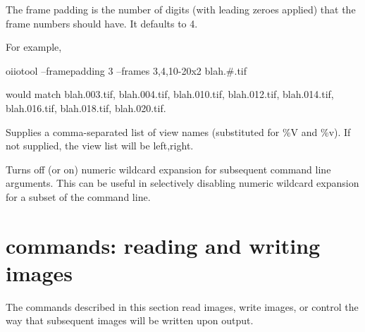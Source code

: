 The frame padding is the number of digits (with leading zeroes applied)
that the frame numbers should have.  It defaults to 4.

For example,
\begin{code}
    oiiotool --framepadding 3 --frames 3,4,10-20x2 blah.#.tif
\end{code}
\noindent would match {\cf blah.003.tif}, {\cf blah.004.tif},
{\cf blah.010.tif}, {\cf blah.012.tif}, 
{\cf blah.014.tif}, {\cf blah.016.tif}, {\cf blah.018.tif}, 
{\cf blah.020.tif}.
\apiend

Supplies a comma-separated list of view names (substituted for {\cf \%V}
and {\cf \%v}). If not supplied, the view list will be {\cf left,right}.
\apiend

Turns off (or on) numeric wildcard expansion for subsequent command
line arguments. This can be useful in selectively disabling numeric wildcard
expansion for a subset of the command line.
\apiend

\section{\oiiotool commands: reading and writing images}

The commands described in this section read images, write images,
or control the way that subsequent images will be written upon output.

